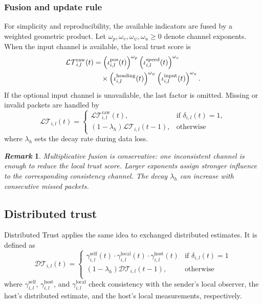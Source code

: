\documentclass[journal,twoside]{IEEEtran}
\def\LT{\mathcal{LT}} %
\def\DT{\mathcal{DT}} %
\newtheorem{remark}{\it Remark}%
\begin{document}
\subsubsection{Fusion and update rule}
For simplicity and reproducibility, the available indicators are fused by a weighted geometric product. Let $\omega_p,\omega_v,\omega_\psi,\omega_u\ge0$ denote channel exponents. When the input channel is available, the local trust score is
\begin{align}
    \LT_{i,l}^{\mathrm{raw}}(t)
    &=\left(\iota_{i,l}^{\text{pos}}(t)\right)^{\omega_p}
    \left(\iota_{i,l}^{\text{speed}}(t)\right)^{\omega_v}
    \notag\\
    &\quad\times
    \left(\iota_{i,l}^{\text{heading}}(t)\right)^{\omega_\psi}
    \left(\iota_{i,l}^{\text{input}}(t)\right)^{\omega_u}.
    \label{eq_local_trust_product}
\end{align}
If the optional input channel is unavailable, the last factor is omitted. Missing or invalid packets are handled by
\begin{equation}
    \LT_{i,l}(t) =
    \left\{ \begin{array}{lc}
        \LT_{i,l}^{\mathrm{raw}}(t),  &  \text{if } \delta_{i,l}(t) = 1, \\
        (1 - \lambda_h)\LT_{i,l}(t-1), & \text{otherwise}
    \end{array}\right.
    \label{eq_local_trust_update}
\end{equation}
where $\lambda_h$ sets the decay rate during data loss.
\begin{remark}
    Multiplicative fusion is conservative: one inconsistent channel is enough to reduce the local trust score. Larger exponents assign stronger influence to the corresponding consistency channel. The decay $\lambda_h$ can increase with consecutive missed packets.
\end{remark}

\subsection{Distributed trust}
Distributed Trust applies the same idea to exchanged distributed estimates. It is defined as
\begin{equation}
        \DT_{i,l}(t)  = \begin{cases}
       \gamma_{i,l}^{\text{self}}(t) \cdot \gamma_{i,l}^{\text{local}}(t) \cdot
        \gamma_{i,l}^{\text{host}}(t)   &  \text{if } \delta_{i,l}(t) = 1 \\
        (1 - \lambda_h)\DT_{i,l}(t-1), & \text{otherwise} \\
    \end{cases}
\end{equation}
where $\gamma_{i,l}^{\text{self}}$, $\gamma_{i,l}^{\text{host}}$, and $\gamma_{i,l}^{\text{local}}$ check consistency with the sender's local observer, the host's distributed estimate, and the host's local measurements, respectively.
\end{document}

